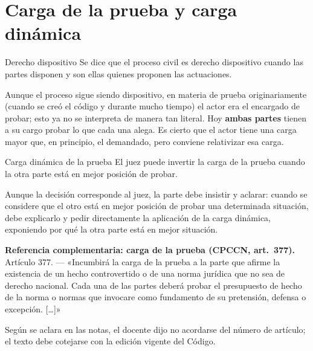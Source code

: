 \documentclass[12pt,oneside]{book}
\begin{document}
\section{Carga de la prueba y carga dinámica}

\begin{definition}{Derecho dispositivo}
Se dice que el proceso civil es derecho dispositivo cuando las partes disponen y son ellas quienes proponen las actuaciones.
\end{definition}

Aunque el proceso sigue siendo dispositivo, en materia de prueba originariamente (cuando se creó el código y durante mucho tiempo) el actor era el encargado de probar; esto ya no se interpreta de manera tan literal. Hoy \textbf{ambas partes} tienen a su cargo probar lo que cada una alega. Es cierto que el actor tiene una carga mayor que, en principio, el demandado, pero conviene relativizar esa carga.

\begin{definition}{Carga dinámica de la prueba}
El juez puede invertir la carga de la prueba cuando la otra parte está en mejor posición de probar.
\end{definition}

Aunque la decisión corresponde al juez, la parte debe insistir y aclarar: cuando se considere que el otro está en mejor posición de probar una determinada situación, debe explicarlo y pedir directamente la aplicación de la carga dinámica, exponiendo por qué la otra parte está en mejor situación.

\begin{note}
\textbf{Referencia complementaria: carga de la prueba (CPCCN, art.~377).}
Artículo 377. --- «Incumbirá la carga de la prueba a la parte que afirme la existencia de un hecho controvertido o de una norma jurídica que no sea de derecho nacional. Cada una de las partes deberá probar el presupuesto de hecho de la norma o normas que invocare como fundamento de su pretensión, defensa o excepción. [\ldots]»

Según se aclara en las notas, el docente dijo no acordarse del número de artículo; el texto debe cotejarse con la edición vigente del Código.
\end{note}
\end{document}
